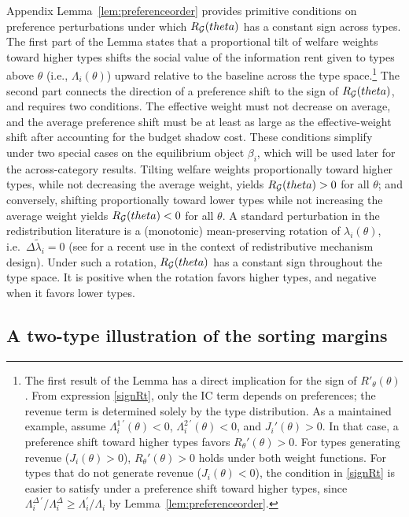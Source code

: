 \documentclass{class}
\begin{document}
Appendix Lemma~\ref{lem:preferenceorder} provides primitive conditions on preference perturbations under which $R_{\mathcal{G}}(theta)$ has a constant sign across types. The first part of the Lemma states that a proportional tilt of welfare weights toward higher types shifts the social value of the information rent given to types above $\theta$ (i.e., $\Lambda_i(\theta)$) upward relative to the baseline across the type space.\footnote{The first result of the Lemma has a direct implication for the sign of $R'_\theta(\theta)$. From expression \ref{signRt}, only the IC term depends on preferences; the revenue term is determined solely by the type distribution. As a maintained example, assume $\Lambda_i^{1\,\prime}(\theta)<0$, $\Lambda_i^{2\,\prime}(\theta)<0$, and $J_i'(\theta)>0$. In that case, a preference shift toward higher types favors $R_\theta'(\theta)>0$. For types generating revenue ($J_i(\theta)>0$), $R_\theta'(\theta)>0$ holds under both weight functions. For types that do not generate revenue ($J_i(\theta)<0$), the condition in \ref{signRt} is easier to satisfy under a preference shift toward higher types, since $\Lambda_i^{\Delta\,\prime}/\Lambda_i^\Delta \ge \Lambda_i^{\prime}/\Lambda_i$ by Lemma~\ref{lem:preferenceorder}.} The second part connects the direction of a preference shift to the sign of $R_{\mathcal{G}}(theta)$, and requires two conditions. The effective weight must not decrease on average, and the average preference shift must be at least as large as the effective-weight shift after accounting for the budget shadow cost. These conditions simplify under two special cases on the equilibrium object $\beta_i$, which will be used later for the across-category results. Tilting welfare weights proportionally toward higher types, while not decreasing the average weight, yields $R_{\mathcal{G}}(theta)>0$ for all $\theta$; and conversely, shifting proportionally toward lower types while not increasing the average weight yields $R_{\mathcal{G}}(theta)<0$ for all $\theta$. A standard perturbation in the redistribution literature is a (monotonic) mean-preserving rotation of $\lambda_i(\theta)$, i.e.\ $\Delta\tilde\lambda_i=0$ (see \cite{Kang2024} for a recent use in the context of redistributive mechanism design). Under such a rotation, $R_{\mathcal{G}}(theta)$ has a constant sign throughout the type space. It is positive when the rotation favors higher types, and negative when it favors lower types.


\subsection{A two-type illustration of the sorting margins}\label{sec3TwoType}
\end{document}
